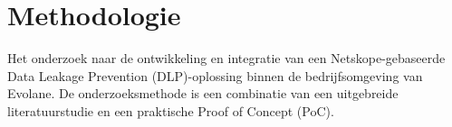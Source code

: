 

\section{Methodologie}%
\label{sec:methodologie}

Het onderzoek naar de ontwikkeling en integratie van een Netskope-gebaseerde Data Leakage Prevention (DLP)-oplossing binnen 
de bedrijfsomgeving van Evolane. De onderzoeksmethode is een combinatie van een uitgebreide literatuurstudie en een praktische Proof of Concept (PoC).





